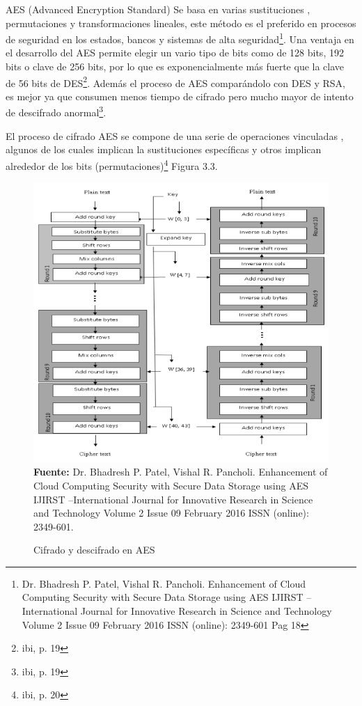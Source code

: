 \documentclass[a4paper,openright,12pt]{book}
\theoremstyle{definition}
\theoremstyle{remark}
\begin{document}
AES (Advanced Encryption Standard) Se basa en varias sustituciones , permutaciones y transformaciones lineales, este método es el preferido en procesos de seguridad en los estados, bancos y sistemas de alta seguridad\footnote{Dr. Bhadresh P. Patel, Vishal R. Pancholi. Enhancement of Cloud Computing Security with Secure Data Storage using AES IJIRST –International Journal for Innovative Research in Science and Technology Volume 2 Issue 09 February 2016 ISSN (online): 2349-601 Pag 18}. Una ventaja en el desarrollo del AES permite elegir un vario tipo de bits como de 128 bits, 192 bits o clave de 256 bits, por lo que es exponencialmente más fuerte que la clave de 56 bits de DES\footnote{ibi, p. 19}. Además el proceso de AES comparándolo con DES y RSA, es mejor ya que consumen menos tiempo de cifrado pero mucho mayor de intento de descifrado anormal\footnote{ibi, p. 19}.  

El proceso de cifrado AES se compone de una serie de operaciones vinculadas , algunos de los cuales implican la sustituciones específicas y otros implican alrededor de los bits (permutaciones)\footnote{ibi, p.  20} Figura 3.3. 

\begin{figure}[htb]
\centering
\caption{Cifrado y descifrado en AES} 
\includegraphics[scale=0.3]{AES}
\label{fig:CifradoAES}
\\ \textbf{Fuente:} Dr. Bhadresh P. Patel, Vishal R. Pancholi. Enhancement of Cloud Computing Security with Secure Data Storage using AES IJIRST –International Journal for Innovative Research in Science and Technology Volume 2 Issue 09 February 2016 ISSN (online): 2349-601.
\end{figure}
\end{document}
